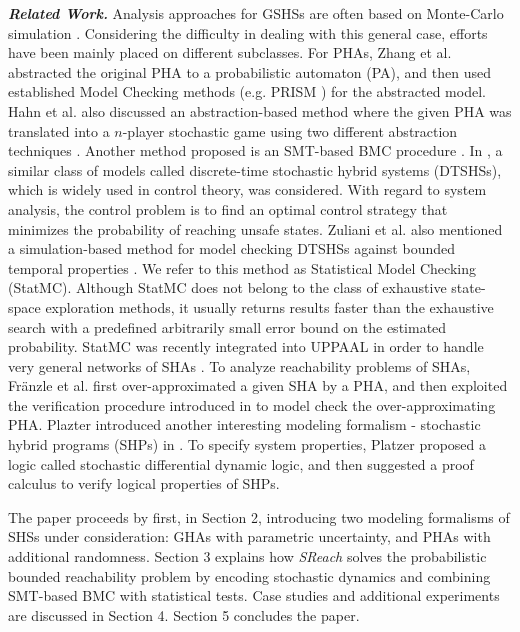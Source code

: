 \vspace{-.2cm}
{\it {\bf Related Work.}} Analysis approaches for GSHSs are often based on Monte-Carlo simulation \cite{blom2004particle}. Considering the difficulty in dealing with this general case, efforts have been mainly placed on different subclasses. For PHAs, Zhang et al. \cite{zhang2012safety} abstracted the original PHA to a probabilistic automaton (PA), and then used established Model Checking methods (e.g. PRISM \cite{website:prism}) for the abstracted model. Hahn et al. also discussed an abstraction-based method where the given PHA was translated into a $n$-player stochastic game using two different abstraction techniques \cite{hahn2011game}. Another method proposed is an SMT-based BMC procedure \cite{franzle2008stochastic}. In \cite{amin2006reachability, abate2007probabilistic, abate2011two, abate2011quantitative}, a similar class of models called discrete-time stochastic hybrid systems (DTSHSs), which is widely used in control theory, was considered. With regard to system analysis, the control problem is to find an optimal control strategy that minimizes the probability of reaching unsafe states. Zuliani et al. also mentioned a simulation-based method for model checking DTSHSs against bounded temporal properties \cite{zuliani2010bayesian}. We refer to this method as Statistical Model Checking (StatMC).  Although StatMC does not belong to the class of exhaustive state-space exploration methods, it usually returns results faster than the exhaustive search with a predefined arbitrarily small error bound on the estimated probability. StatMC was recently integrated into UPPAAL \cite{larsen1997uppaal} in order to handle very general networks of SHAs \cite{david2012statistical}. To analyze reachability problems of SHAs, Fr\"{a}nzle et al. \cite{franzle2011measurability} first over-approximated a given SHA by a PHA, and then exploited the verification procedure introduced in \cite{zhang2012safety} to model check the over-approximating PHA. Plazter introduced another interesting modeling formalism - stochastic hybrid programs (SHPs) in \cite{platzer2011stochastic}. To specify system properties, Platzer proposed a logic called stochastic differential dynamic logic, and then suggested a proof calculus to verify logical properties of SHPs. 


\vspace{-.2cm}
The paper proceeds by first, in Section 2, introducing two modeling formalisms of SHSs under consideration: GHAs with parametric uncertainty, and PHAs with additional randomness. Section 3 explains how {\it SReach} solves the probabilistic bounded reachability problem by encoding stochastic dynamics and combining SMT-based BMC with statistical tests. Case studies and additional experiments are discussed in Section 4. Section 5 concludes the paper.
